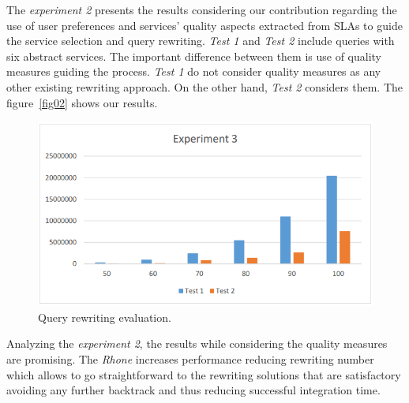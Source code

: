 The \textit{experiment 2} presents the results considering our contribution regarding the use of user preferences and services' quality aspects extracted from SLAs to guide the service selection and query rewriting.
\textit{Test 1} and \textit{Test 2} include queries with six abstract services. 
The important difference between them is use of quality measures guiding the process. \textit{Test 1} do not consider quality measures as any other existing rewriting approach. On the other hand, \textit{Test 2} considers them.
The figure~\ref{fig02} shows our results. 

\begin{figure}[!h]
\centering
\includegraphics[scale=0.4]{exp3.png}
\caption{Query rewriting evaluation.}\label{fig03}
\end{figure} 

Analyzing the \textit{experiment 2}, the results while considering the quality measures are promising.  
The \textit{Rhone} increases performance reducing rewriting number which allows to go straightforward to the rewriting solutions that are satisfactory avoiding any further backtrack and thus reducing successful integration time.